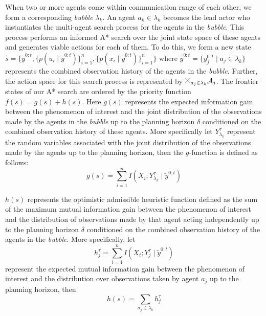 \documentclass[letterpaper, 10 pt, conference]{IEEEConference}
\newcommand{\cross}{%
  \begin{tikzpicture}[scale=0.25]
    \draw (0,0) -- (1,1); %
    \draw (0,1) -- (1,0); %
  \end{tikzpicture}%
}
\begin{document}

When two or more agents come within communication range of each other, we form a corresponding \textit{bubble} $\lambda_k$. An agent $a_k \in \lambda_k$ becomes the lead actor who instantiates the multi-agent search process for the agents in the \textit{bubble}. This process performs an informed A* search over the joint state space of these agents and generates viable actions for each of them. To do this, we form a new state $\tilde{s} = \{ \tilde{y}^{0:t}, \lbrace p(u_i \mid \tilde{y}^{0:t}) \rbrace_{i=1}^{n},  \lbrace p(x_i \mid \tilde{y}^{0:t}) \rbrace_{i=1}^{n} \}$ where $\tilde{y}^{0:t} = \{y_j^{0:t} \mid a_j \in \lambda_k \}$ represents the combined observation history of the agents in the \textit{bubble}. Further, the action space for this search process is represented by $\cross_{a_j \in \lambda_k} \mathcal{A}_j$. The frontier states of our A* search are ordered by the priority function $f(s) = g(s) + h(s)$. Here $g(s)$ represents the expected information gain between the phenomenon of interest and the joint distribution of the observations made by the agents in the \textit{bubble} up to the planning horizon $\delta$ conditioned on the combined observation history of these agents. More specifically let $Y_{\lambda_k}^{\tau}$ represent the random variables associated with the joint distribution of the observations made by the agents up to the planning horizon, then the $g$-function is defined as follows:
\begin{dmath*}
    g(s) = \sum_{i=1}^n I{(X_i; Y_{\lambda_k}^{\tau} \mid \tilde{y}^{0:t})} 
\end{dmath*}
    
$h(s)$ represents the optimistic admissible heuristic function defined as the sum of the maximum mutual information gain between the phenomenon of interest and the distribution of observations made by that agent acting independently up to the planning horizon $\delta$ conditioned on the combined observation history of the agents in the \textit{bubble}. More specifically, let 
\begin{dmath*}
    h_j^{\tau} = \sum_{i=1}^n I{(X_i; Y_j^{\tau} \mid \tilde{y}^{0:t})} 
\end{dmath*}
%
represent the expected mutual information gain between the phenomenon of interest and the distribution over observations taken by agent $a_j$ up to the planning horizon, then 
\[
    h(s) = \sum_{a_j \in \lambda_k} h_j^{\tau}
\]
\end{document}
